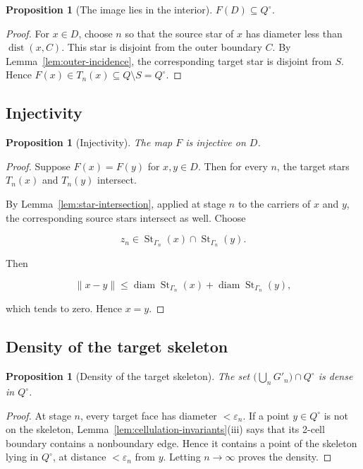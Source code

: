 \documentclass[11pt]{article}
\theoremstyle{mainplain}
\newtheorem{proposition}[theorem]{Proposition}
\theoremstyle{mainroman}
\theoremstyle{definition}
\numberwithin{equation}{section}
\begin{document}
\begin{proposition}[The image lies in the interior]\label{prop:image-interior}
\(F(D)\subseteq Q^\circ\).
\end{proposition}
\begin{proof}
For \(x\in D\), choose \(n\) so that the source star of \(x\) has diameter less than \(\operatorname{dist}(x,C)\). This star is disjoint from the outer boundary \(C\). By Lemma~\ref{lem:outer-incidence}, the corresponding target star is disjoint from \(S\). Hence \(F(x)\in T_n(x)\subseteq Q\setminus S=Q^\circ\).
\end{proof}

\subsection{Injectivity}\label{injectivity}

\begin{proposition}[Injectivity]\label{prop:F-injective}
The map \(F\) is injective on \(D\).
\end{proposition}
\begin{proof}
Suppose \(F(x)=F(y)\) for \(x,y\in D\). Then for every \(n\), the target stars \(T_n(x)\) and \(T_n(y)\) intersect.

By Lemma~\ref{lem:star-intersection}, applied at stage \(n\) to the carriers of \(x\) and \(y\), the corresponding source stars intersect as well. Choose

\[
z_n\in
 \operatorname{St}_{\Gamma_n}(x)
 \cap
 \operatorname{St}_{\Gamma_n}(y).
\]

Then

\[
\|x-y\|
 \le
 \operatorname{diam}\operatorname{St}_{\Gamma_n}(x)
 +
 \operatorname{diam}\operatorname{St}_{\Gamma_n}(y),
\]

which tends to zero. Hence \(x=y\).
\end{proof}

\subsection{Density of the target skeleton}\label{density-of-the-target-skeleton}

\begin{proposition}[Density of the target skeleton]\label{prop:target-skeleton-dense}
The set \(\bigl(\bigcup_nG'_n\bigr)\cap Q^\circ\) is dense in
\(Q^\circ\).
\end{proposition}
\begin{proof}
At stage \(n\), every target face has diameter \(<\varepsilon_n\). If a point \(y\in Q^\circ\) is not on the skeleton,
Lemma~\ref{lem:cellulation-invariants}\textup{(iii)} says that its 2-cell
boundary contains a nonboundary edge. Hence it contains a point of the skeleton lying in \(Q^\circ\), at distance \(<\varepsilon_n\) from \(y\). Letting \(n\to\infty\) proves the density.
\end{proof}
\end{document}
